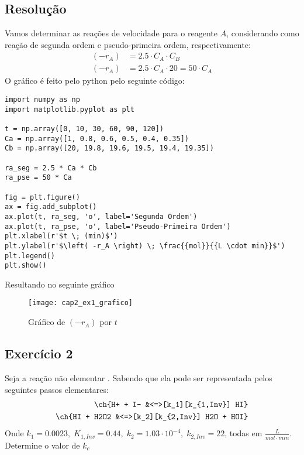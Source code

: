 \subsection{Resolução}
Vamos determinar as reações de velocidade para o reagente \(A\), considerando como reação de segunda
ordem e pseudo-primeira ordem, respectivamente:
\begin{align}
    \left( -r_A \right) &= 2.5 \cdot C_A \cdot C_B \\
    \left( -r_A \right) &= 2.5 \cdot C_A \cdot 20 = 50 \cdot C_A
\end{align}
O gráfico é feito pelo python pelo seguinte código:
\begin{verbatim}
import numpy as np
import matplotlib.pyplot as plt

t = np.array([0, 10, 30, 60, 90, 120])
Ca = np.array([1, 0.8, 0.6, 0.5, 0.4, 0.35])
Cb = np.array([20, 19.8, 19.6, 19.5, 19.4, 19.35])

ra_seg = 2.5 * Ca * Cb
ra_pse = 50 * Ca

fig = plt.figure()
ax = fig.add_subplot()
ax.plot(t, ra_seg, 'o', label='Segunda Ordem')
ax.plot(t, ra_pse, 'o', label='Pseudo-Primeira Ordem')
plt.xlabel(r'$t \; (min)$')
plt.ylabel(r'$\left( -r_A \right) \; \frac{{mol}}{{L \cdot min}}$')
plt.legend()
plt.show()
\end{verbatim}
Resultando no seguinte gráfico
\begin{figure}[H]
    \centering
    \texttt{[image: cap2\_ex1\_grafico]}
    \caption{Gráfico de \(\left( -r_A \right) \) por \(t\)}
    \label{fig:cap2_ex1_grafico}
\end{figure}
\subsection{Exercício 2}
Seja a reação não elementar . Sabendo que ela pode ser representada
pelos seguintes passos elementares:
\begin{align*}
    \ch{H+ + I- &<=>[k_1][k_{1,Inv}] HI} \\
    \ch{HI + H2O2 &<=>[k_2][k_{2,Inv}] H2O + HOI} \\
\end{align*}
Onde \(k_1 = 0.0023, \; K_{1, Inv} = 0.44, \; k_2 = 1.03 \cdot 10^{-4}, \; k_{2, Inv} = 22 \), todas
em \(\frac{L}{mol \cdot min}\). Determine o valor de \(k_{c} \) 
